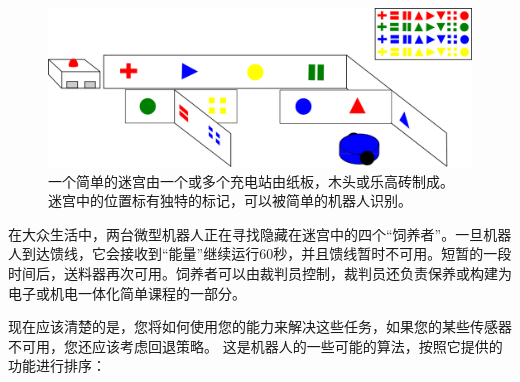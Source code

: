 \begin{figure}
	\centering
		\includegraphics[width=\textwidth]{figs/ratslife.png}
	\caption{一个简单的迷宫由一个或多个充电站由纸板，木头或乐高砖制成。 迷宫中的位置标有独特的标记，可以被简单的机器人识别。}
	\label{fig:ratslife}
\end{figure}


在大众生活中，两台微型机器人正在寻找隐藏在迷宫中的四个“饲养者”。一旦机器人到达馈线，它会接收到“能量”继续运行60秒，并且馈线暂时不可用。短暂的一段时间后，送料器再次可用。饲养者可以由裁判员控制，裁判员还负责保养或构建为电子或机电一体化简单课程的一部分。


现在应该清楚的是，您将如何使用您的能力来解决这些任务，如果您的某些传感器不可用，您还应该考虑回退策略。 这是机器人的一些可能的算法，按照它提供的功能进行排序：

